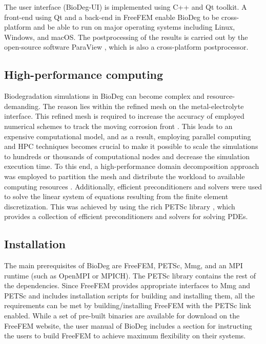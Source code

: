 The user interface (BioDeg-UI) is implemented using C++ and Qt toolkit. A front-end using Qt and a back-end in FreeFEM enable BioDeg to be cross-platform and be able to run on major operating systems including Linux, Windows, and macOS. The postprocessing of the results is carried out by the open-source software ParaView \cite{Ahrens2005}, which is also a cross-platform postprocessor.

\subsection{High-performance computing}

Biodegradation simulations in BioDeg can become complex and resource-demanding. The reason lies within the refined mesh on the metal-electrolyte interface. This refined mesh is required to increase the accuracy of employed numerical schemes to track the moving corrosion front \cite{Barzegari2021, Barzegari2022}. This leads to an expensive computational model, and as a result, employing parallel computing and \gls{HPC} techniques becomes crucial to make it possible to scale the simulations to hundreds or thousands of computational nodes and decrease the simulation execution time. To this end, a high-performance domain decomposition approach was employed to partition the mesh and distribute the workload to available computing resources \cite{Dolean2015}. Additionally, efficient preconditioners and solvers were used to solve the linear system of equations resulting from the finite element discretization. This was achieved by using the rich \gls{PETSc} library \cite{petsc}, which provides a collection of efficient preconditioners and solvers for solving \gls{PDE}s.

\subsection{Installation}

The main prerequisites of BioDeg are FreeFEM, \gls{PETSc}, Mmg, and an \gls{MPI} runtime (such as OpenMPI or MPICH). The \gls{PETSc} library contains the rest of the dependencies. Since FreeFEM provides appropriate interfaces to Mmg and \gls{PETSc} and includes installation scripts for building and installing them, all the requirements can be met by building/installing FreeFEM with the \gls{PETSc} link enabled. While a set of pre-built binaries are available for download on the FreeFEM website, the user manual of BioDeg includes a section for instructing the users to build FreeFEM to achieve maximum flexibility on their systems.

